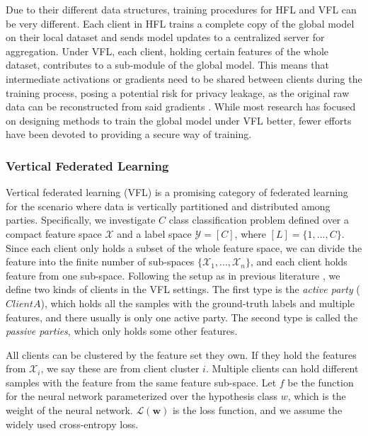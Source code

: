 \documentclass[withindex,glossary,firstyr]{cam-thesis}
\begin{document}
Due to their different data structures, training procedures for HFL and VFL can be very different. Each client in HFL trains a complete copy of the global model on their local dataset and sends model updates to a centralized server for aggregation. Under VFL,  each client, holding certain features of the whole dataset, contributes to a sub-module of the global model. This means that intermediate activations or gradients need to be shared between clients during the training process, posing a potential risk for privacy leakage, as the original raw data can be reconstructed from said gradients \citep{dlg, idlg, jin2021cafe,yin2021see}. While most research has focused on designing methods to train the global model under VFL better, fewer efforts have been devoted to providing a secure way of training. %

\subsubsection{Vertical Federated Learning} \label{sec:problem_setup}
Vertical federated learning (VFL) is a promising category of federated learning for the scenario where data is vertically partitioned and distributed among parties. 
Specifically, we investigate $C$ class classification problem defined over a compact feature space $\mathcal{X}$ and a label space $\mathcal{Y} = [C]$, where $[L] = \{ 1,...,C \}$. Since each client only holds a subset of the whole feature space, we can divide the feature into the finite number of sub-spaces $\{\mathcal{X}_1,...,\mathcal{X}_n \}$, and each client holds feature from one sub-space. Following the setup as in previous literature \citep{vfl}, we define two kinds of clients in the VFL settings. The first type is the \emph{active party} ($Client A$), which holds all the samples with the ground-truth labels and multiple features, and there usually is only one active party. The second type is called the \emph{passive parties}, which only holds some other features.  

All clients can be clustered by the feature set they own. If they hold the features from $\mathcal{X}_i$, we say these are from client cluster $i$. Multiple clients can hold different samples with the feature from the same feature sub-space. 
Let $f$ be the function for the neural network parameterized over the hypothesis class $w$, which is the weight of the neural network. $\mathcal{L}(\textbf{w})$ is the loss function, and we assume the widely used cross-entropy loss.
\end{document}
